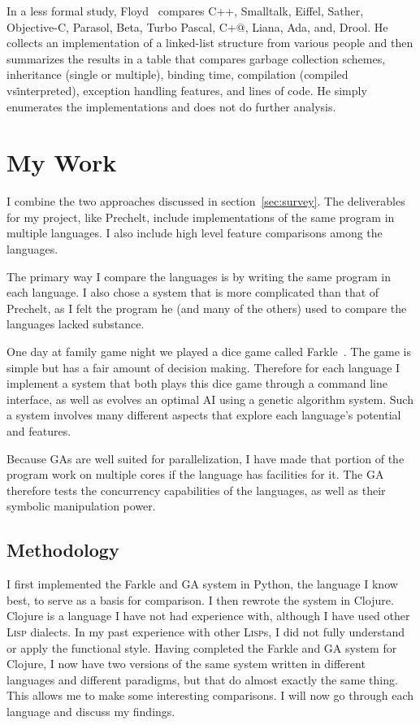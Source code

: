 \documentclass{article}
\begin{document}
In a less formal study, Floyd~\cite{DDJFloydeCompOOLangs} compares C++,
Smalltalk, Eiffel, Sather, Objective-C, Parasol, Beta, Turbo Pascal, C+@,
Liana, Ada, and, Drool.  He collects an implementation of a linked-list
structure from various people and then summarizes the results in a table that
compares garbage collection schemes, inheritance (single or multiple), binding
time, compilation (compiled vs\. interpreted), exception handling features, and
lines of code.  He simply enumerates the implementations and does not do
further analysis.

\section{My Work}

I combine the two approaches discussed in section~\ref{sec:survey}.  The
deliverables for my project, like Prechelt, include implementations of the same
program in multiple languages. I also include high level feature comparisons
among the languages.

The primary way I compare the languages is by writing the same program in each
language.  I also chose a system that is more complicated than that of Prechelt,
as I felt the program he (and many of the others) used to compare the languages
lacked substance.

One day at family game night we played a dice game called
Farkle~\cite{farklewikipedia}.  The game is simple but has a fair amount of
decision making.  Therefore for each language I implement a system that both
plays this dice game through a command line interface, as well as evolves an
optimal AI using a genetic algorithm system.  Such a system involves many
different aspects that explore each language's potential and features.

Because GAs are well suited for parallelization, I have made that portion of the
program work on multiple cores if the language has facilities for it.  The GA
therefore tests the concurrency capabilities of the languages, as well as
their symbolic manipulation power.

\subsection{Methodology}

I first implemented the Farkle and GA system in Python, the language I know
best, to serve as a basis for comparison.  I then rewrote the system in Clojure.
Clojure is a language I have not had experience with, although I have used other
\textsc{Lisp} dialects.  In my past experience with other \textsc{Lisp}s, I did not
fully understand or apply the functional style.  Having completed the Farkle and
GA system for Clojure, I now have two versions of the same system written in
different languages and different paradigms, but that do almost exactly the
same thing.  This allows me to make some interesting comparisons.  I will now go
through each language and discuss my findings.
\end{document}
